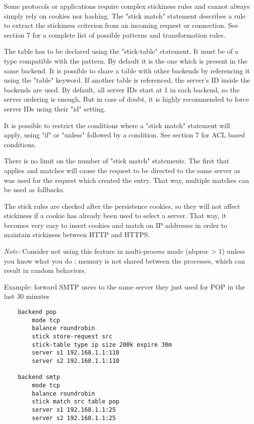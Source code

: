   Some protocols or applications require complex stickiness rules and cannot
  always simply rely on cookies nor hashing. The "stick match" statement
  describes a rule to extract the stickiness criterion from an incoming request
  or connection. See section 7 for a complete list of possible patterns and
  transformation rules.

  The table has to be declared using the "stick-table" statement. It must be of
  a type compatible with the pattern. By default it is the one which is present
  in the same backend. It is possible to share a table with other backends by
  referencing it using the "table" keyword. If another table is referenced,
  the server's ID inside the backends are used. By default, all server IDs
  start at 1 in each backend, so the server ordering is enough. But in case of
  doubt, it is highly recommended to force server IDs using their "id" setting.

  It is possible to restrict the conditions where a "stick match" statement
  will apply, using "if" or "unless" followed by a condition. See section 7 for
  ACL based conditions.

  There is no limit on the number of "stick match" statements. The first that
  applies and matches will cause the request to be directed to the same server
  as was used for the request which created the entry. That way, multiple
  matches can be used as fallbacks.

  The stick rules are checked after the persistence cookies, so they will not
  affect stickiness if a cookie has already been used to select a server. That
  way, it becomes very easy to insert cookies and match on IP addresses in
  order to maintain stickiness between HTTP and HTTPS.

  \emph{Note:} Consider not using this feature in multi-process mode (nbproc > 1)
         unless you know what you do : memory is not shared between the
         processes, which can result in random behaviors.

  Example: forward SMTP users to the same server they just used for POP in the last 30 minutes
  \begin{verbatim}
    backend pop
        mode tcp
        balance roundrobin
        stick store-request src
        stick-table type ip size 200k expire 30m
        server s1 192.168.1.1:110
        server s2 192.168.1.1:110

    backend smtp
        mode tcp
        balance roundrobin
        stick match src table pop
        server s1 192.168.1.1:25
        server s2 192.168.1.1:25
  \end{verbatim}

